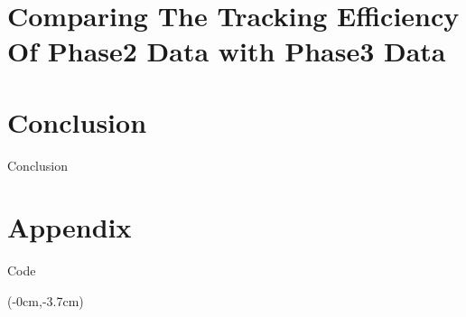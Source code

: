 \documentclass[8pt]{beamer}
\begin{document}
\section{Comparing The Tracking Efficiency Of Phase2 Data with Phase3 Data}





\section{Conclusion}

\begin{frame}{Conclusion}
	
	
\end{frame}



\appendix
\section{Appendix}
\begin{frame}{Code}


\lstset{language=Python}
\lstset{basicstyle=\normalsize}

\begin{textblock*}{\textwidth}(-0cm,-3.7cm)
	
	
	
	
\end{textblock*}


\end{frame}
\end{document}
